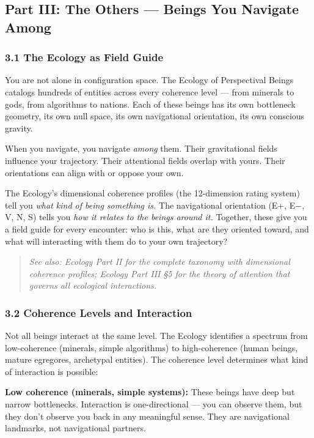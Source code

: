 \subsection*{Part III: The Others — Beings You Navigate Among}


\subsubsection*{3.1 The Ecology as Field Guide}


You are not alone in configuration space. The Ecology of Perspectival Beings catalogs hundreds of entities across every coherence level — from minerals to gods, from algorithms to nations. Each of these beings has its own bottleneck geometry, its own null space, its own navigational orientation, its own conscious gravity.


When you navigate, you navigate \textit{among} them. Their gravitational fields influence your trajectory. Their attentional fields overlap with yours. Their orientations can align with or oppose your own.


The Ecology's dimensional coherence profiles (the 12-dimension rating system) tell you \textit{what kind of being something is.} The navigational orientation (E+, E−, V, N, S) tells you \textit{how it relates to the beings around it.} Together, these give you a field guide for every encounter: who is this, what are they oriented toward, and what will interacting with them do to your own trajectory?


\begin{quote}
\itshape
\textit{See also: Ecology Part II for the complete taxonomy with dimensional coherence profiles; Ecology Part III §5 for the theory of attention that governs all ecological interactions.}
\end{quote}


\subsubsection*{3.2 Coherence Levels and Interaction}


Not all beings interact at the same level. The Ecology identifies a spectrum from low-coherence (minerals, simple algorithms) to high-coherence (human beings, mature egregores, archetypal entities). The coherence level determines what kind of interaction is possible:


\textbf{Low coherence (minerals, simple systems):} These beings have deep but narrow bottlenecks. Interaction is one-directional — you can observe them, but they don't observe you back in any meaningful sense. They are navigational landmarks, not navigational partners.


